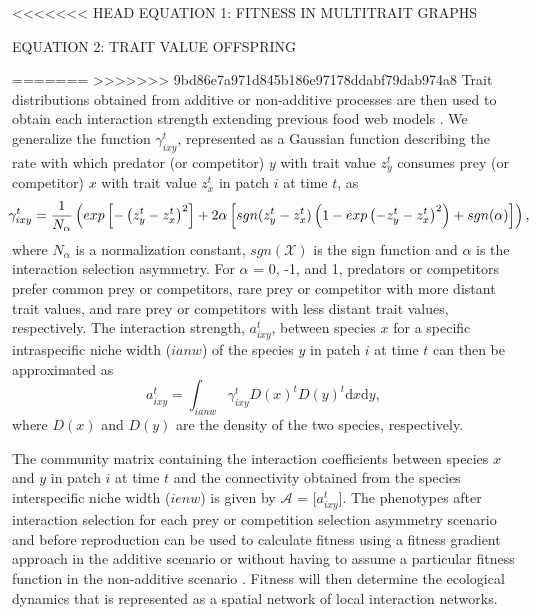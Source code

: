 \documentclass[12pt]{article}
\begin{document}
\begin{center}
\begin{mybox}
\begin{singlespace}
\begin{small}
<<<<<<< HEAD
 EQUATION 1: FITNESS IN MULTITRAIT GRAPHS
 
 EQUATION 2: TRAIT VALUE OFFSPRING


=======
>>>>>>> 9bd86e7a971d845b186e97178ddabf79dab974a8
  Trait distributions obtained from additive or non-additive processes
  are then used to obtain each interaction strength extending previous
  food web models
  \citep{Loeuille&Loreau:2005,Allhoff&Drossel:2013,Melianetal:2014}. We
  generalize the function $\gamma^{t}_{ixy}$, represented as a
  Gaussian function describing the rate with which predator (or
  competitor) $y$ with trait value $z^{t}_{y}$ consumes prey (or
  competitor) $x$ with trait value $z^{t}_{x}$ in patch $i$ at time
  $t$, as
\begin{equation}
  \hspace{-0.05 in} \gamma^{t}_{ixy} =  \frac{1}{N_\alpha} \left( exp \left[ -\left(z^{t}_{y} - z^{t}_{x}\right)^2 \right] + 2\alpha \left[sgn(z^{t}_{y} - z^{t}_{x}) \left(1 - exp \left(-z^{t}_{y} - z^{t}_{x}\right)^2 \right) + sgn(\alpha) \right] \right),\hspace{-0.15 in} 
\end{equation}
where $N_\alpha$ is a normalization constant, $sgn(\mathcal{X})$ is
the sign function and $\alpha$ is the interaction selection
asymmetry. For $\alpha$ = 0, -1, and 1, predators or competitors
prefer common prey or competitors, rare prey or competitor with more
distant trait values, and rare prey or competitors with less distant
trait values, respectively. The interaction strength, $a^{t}_{ixy}$,
between species $x$ for a specific intraspecific niche width ($ianw$)
of the species $y$ in patch $i$ at time $t$ can then be approximated
as
\begin{equation}
  a^{t}_{ixy} = \int_{ianw} \gamma^{t}_{ixy} D(x)^{t} D(y)^{t} \mathrm{d}x \mathrm{d}y,
\end{equation}
where $D(x)$ and $D(y)$ are the density of the two species,
respectively.

The community matrix containing the interaction coefficients between
species $x$ and $y$ in patch $i$ at time $t$ and the connectivity
obtained from the species interspecific niche width
($ienw$)\citep{Loeuille&Loreau:2005,Allhoff&Drossel:2013} is given by
$\mathcal{A}$ = [$a^{t}_{ixy}$]. The phenotypes after interaction
selection for each prey or competition selection asymmetry scenario
and before reproduction can be used to calculate fitness using a
fitness gradient approach in the additive scenario
\citep{Guimaraesetal:2017} or without having to assume a particular
fitness function in the non-additive scenario
\citep{DeLong&Gibert:2016}. Fitness will then determine the ecological
dynamics that is represented as a spatial network of local interaction
networks.


\end{small}
\end{singlespace}
\end{mybox}
\end{center}
\end{document}
